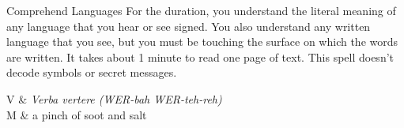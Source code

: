 \begin{Spell}[
    level=1st,
    time=1 Action,
    range=Self,
    components={V, S, M},
    duration=1 Hour,
    school=Divination,
    attack=None,
    effect=Social
  ]{Comprehend Languages}
For the duration, you understand the literal meaning of any language that you hear or see signed. You also understand any written language that you see, but you must be touching the surface on which the words are written. It takes about 1 minute to read one page of text. This spell doesn't decode symbols or secret messages.

\begin{components}
V & \textit{Verba vertere (WER-bah WER-teh-reh)} \\
M & a pinch of soot and salt
\end{components}
\end{Spell}


